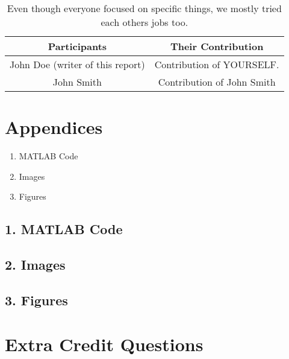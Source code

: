 \documentclass[10pt]{article}
\begin{document}
\begin{table}[H]
    \centering
    \begin{tabular}{| c : c |}
    \hline
        \textbf{Participants} & \textbf{Their Contribution} \\
    \hline\hline
        John Doe (writer of this report) & Contribution of YOURSELF. \\
    \hline
        John Smith & Contribution of John Smith \\
    \hline
    \end{tabular}
    \caption{Even though everyone focused on specific things, we mostly tried each others jobs too.}
\end{table}



\printbibliography

\section{Appendices}


\begin{enumerate}
    \item MATLAB Code
    \item Images
    \item Figures %
\end{enumerate}

\subsection{1. MATLAB Code}



\subsection{2. Images}


\subsection{3. Figures}

\section{Extra Credit Questions}
\end{document}
